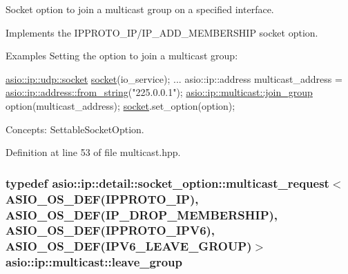 Socket option to join a multicast group on a specified interface. 

Implements the I\+P\+P\+R\+O\+T\+O\+\_\+\+I\+P/\+I\+P\+\_\+\+A\+D\+D\+\_\+\+M\+E\+M\+B\+E\+R\+S\+H\+I\+P socket option.

\begin{DoxyParagraph}{Examples}
Setting the option to join a multicast group\+: 
\begin{DoxyCode}
\hyperlink{classasio_1_1basic__datagram__socket}{asio::ip::udp::socket} \hyperlink{namespacewebsocketpp_1_1transport_1_1asio_1_1socket_1_1error_a828ddaa5ed63a761e1b557465a35f05aa0c31b356014843e1d09514e794a539a7}{socket}(io\_service); 
...
asio::ip::address multicast\_address =
  \hyperlink{classasio_1_1ip_1_1address_a243a3c877143eff5cdf97a6b021febec}{asio::ip::address::from\_string}(\textcolor{stringliteral}{"225.0.0.1"});
\hyperlink{classasio_1_1ip_1_1detail_1_1socket__option_1_1multicast__request}{asio::ip::multicast::join\_group} option(multicast\_address);
\hyperlink{namespacewebsocketpp_1_1transport_1_1asio_1_1socket_1_1error_a828ddaa5ed63a761e1b557465a35f05aa0c31b356014843e1d09514e794a539a7}{socket}.set\_option(option);
\end{DoxyCode}

\end{DoxyParagraph}
\begin{DoxyParagraph}{Concepts\+:}
Settable\+Socket\+Option. 
\end{DoxyParagraph}


Definition at line 53 of file multicast.\+hpp.

\hypertarget{namespaceasio_1_1ip_1_1multicast_ae0f41e19e723749f6373383e45020844}{}
\subsubsection[{leave\+\_\+group}]{\setlength{\rightskip}{0pt plus 5cm}typedef {\bf asio\+::ip\+::detail\+::socket\+\_\+option\+::multicast\+\_\+request}$<$ {\bf A\+S\+I\+O\+\_\+\+O\+S\+\_\+\+D\+E\+F}(I\+P\+P\+R\+O\+T\+O\+\_\+\+I\+P), {\bf A\+S\+I\+O\+\_\+\+O\+S\+\_\+\+D\+E\+F}(I\+P\+\_\+\+D\+R\+O\+P\+\_\+\+M\+E\+M\+B\+E\+R\+S\+H\+I\+P), {\bf A\+S\+I\+O\+\_\+\+O\+S\+\_\+\+D\+E\+F}(I\+P\+P\+R\+O\+T\+O\+\_\+\+I\+P\+V6), {\bf A\+S\+I\+O\+\_\+\+O\+S\+\_\+\+D\+E\+F}(I\+P\+V6\+\_\+\+L\+E\+A\+V\+E\+\_\+\+G\+R\+O\+U\+P)$>$ {\bf asio\+::ip\+::multicast\+::leave\+\_\+group}}\label{namespaceasio_1_1ip_1_1multicast_ae0f41e19e723749f6373383e45020844}


